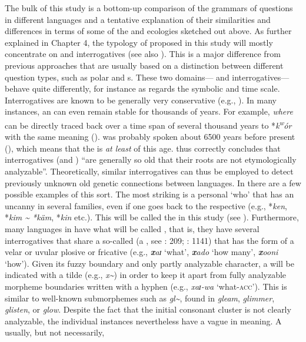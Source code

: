 The bulk of this study is a bottom-up comparison of the grammars of questions in different languages and a tentative explanation of their similarities and differences in terms of some of the  and ecologies sketched out above. As further explained in Chapter 4, the typology of  proposed in this study will mostly concentrate on  and interrogatives (see also \citealt{Huang1999}). This is a major difference from previous approaches that are usually based on a distinction between different question types, such as polar and s. These two domains--- and interrogatives---behave quite differently, for instance as regards the symbolic  and  time scale. Interrogatives are known to be generally very conservative (e.g., \citealt{Diessel2003}). In many instances, an  can even remain stable for thousands of years. For example,  \textit{where} can be directly traced back over a time span of several thousand years to  *\textit{k\textsuperscript{w}ór} with the same meaning (\citealt[419f.]{MalloryAdams2006}).  was probably spoken about 6500 years before present (\citealt{AnthonyRinge2015}), which means that the  is \textit{at least} of this age. \citet[649]{Diessel2003} thus correctly concludes that interrogatives (and ) “are generally so old that their roots are not etymologically analyzable”. Theoretically, similar interrogatives can thus be employed to detect previously unknown old genetic connections between languages. In  there are a few possible examples of this sort. The most striking is a personal  ‘who’ that has an uncanny  in several families, even if one goes back to the respective  (e.g.,  *\textit{ken},  *\textit{kim {\textasciitilde} *käm},  *\textit{kin} etc.). This will be called the \textit{} in this study (see ). Furthermore, many languages in  have what will be called \textit{}, that is, they have several interrogatives that share a so-called \textit{} (a , see \citealt{BickelNichols2007}: 209; \citealt{Mackenzie2009}: 1141) that has the form of a velar or uvular plosive or fricative (e.g.,  \textbf{\textit{x}}\textit{aɪ} ‘what’, \textbf{\textit{x}}\textit{ado} ‘how many’, \textbf{\textit{x}}\textit{ooni} ‘how’). Given its fuzzy boundary and only partly analyzable character, a  will be indicated with a tilde (e.g.,  \textit{x{\textasciitilde}}) in order to keep it apart from fully analyzable morpheme boundaries written with a hyphen (e.g.,  \textit{xaɪ-wa} ‘what-\textsc{acc}’). This is similar to well-known submorphemes such as  \textit{gl{\textasciitilde}}, found in \textit{gleam}, \textit{glimmer}, \textit{glisten}, or \textit{glow}. Despite the fact that the initial consonant cluster is not clearly analyzable, the individual instances nevertheless have a vague  in meaning. A  usually, but not necessarily, 